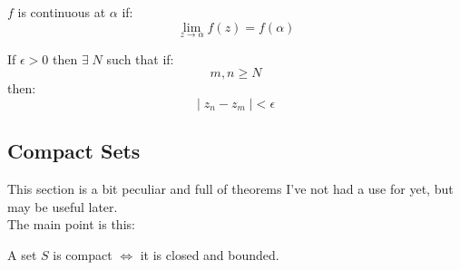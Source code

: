 \begin{defn}
	$f$ is continuous at $\alpha$ if:
	\[ \lim_{z \to \alpha} f(z) = f(\alpha) \]
\end{defn} 

\begin{defn}
	If $\epsilon > 0$ then $\exists \; N$ such that if:
	\[ m, n \geq N \]
	then:
	\[| \; {z}_{n} - {z}_{m} \; | < \epsilon \]
\end{defn}

\subsection{Compact Sets}
This section is a bit peculiar and full of theorems I've not had a use for yet, but may be useful later. \\

The main point is this:
\begin{thm}
	A set $S$ is compact $\iff$ it is closed and bounded.
\end{thm}

